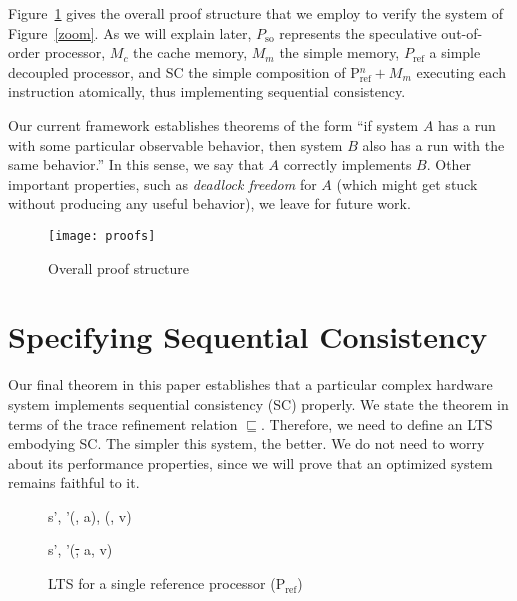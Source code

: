 Figure~\ref{proofs} gives the overall proof structure that we employ to verify
the system of Figure~\ref{zoom}. As we will explain later, $P_\text{so}$
represents the speculative out-of-order processor, $M_c$ the cache memory,
$M_m$ the simple memory, $P_\text{ref}$ a simple decoupled processor, and
SC the simple composition of P$^n_\text{ref}+ M_m$ executing each
instruction atomically, thus implementing sequential consistency.

Our current framework establishes theorems of the form ``if system $A$ has a run
with some particular observable behavior, then system $B$ also has a run with
the same behavior.''  In this sense, we say that $A$ correctly implements $B$.
Other important properties, such as \emph{deadlock freedom} for $A$ (which
might get stuck without producing any useful behavior), we leave for future
work.

\begin{figure}
\texttt{[image: proofs]}
\caption{Overall proof structure}
\label{proofs}
\end{figure}

\section{Specifying Sequential Consistency}\label{sec:sc}

Our final theorem in this paper establishes that a particular complex hardware
system implements sequential consistency (SC) properly.  We state the theorem
in terms of the trace refinement relation $\sqsubseteq$.
Therefore, we need to define an LTS embodying SC.  The simpler this
system, the better.  We do not need to worry about its performance properties,
since we will prove that an optimized system remains faithful to it.

\begin{figure}
\small
\centering
\begin{boxedminipage}[c]{.48\textwidth}
{}

{}

{
{s', \pc'}{(\ld\req, a), (\ld\resp, v)}}

{
{s', \pc'}{(\st, a, v)}}
\end{boxedminipage}

\caption{LTS for a single reference processor (P$_{\text{ref}}$)}
\label{Pref$}
\end{figure}


